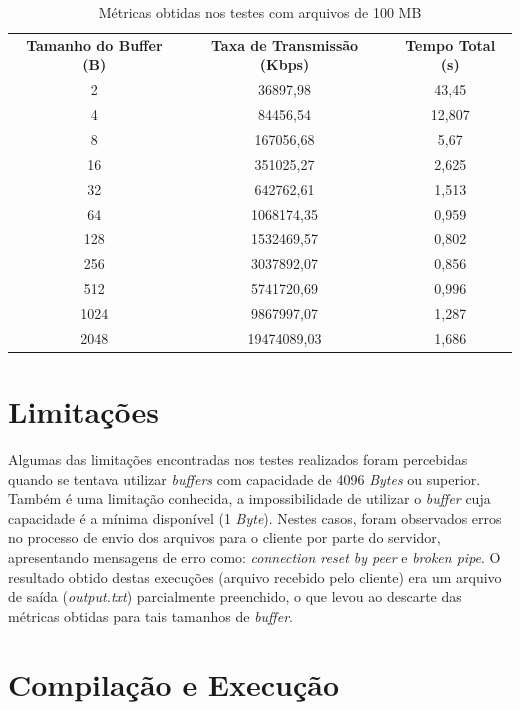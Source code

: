 \documentclass[a4paper, 12pt]{article}
\begin{document}
\begin{table}[H]
    \centering
    \caption{Métricas obtidas nos testes com arquivos de 100 MB}
    \vspace{0.2cm}
    \label{tab:exampleTab3}
    \begin{tabular}{c|c|c}
        \vspace{0.2cm}
        \textbf{Tamanho do Buffer (B)} & \textbf{Taxa de Transmissão (Kbps)} & \textbf{Tempo Total (s)}\\
        2 & 36897,98 & 43,45\\
        4 & 84456,54 & 12,807\\
        8 & 167056,68 & 5,67\\
        16 & 351025,27 & 2,625\\
        32 & 642762,61 & 1,513\\
        64 & 1068174,35 & 0,959\\
        128 & 1532469,57 & 0,802\\
        256 & 3037892,07 & 0,856\\
        512 & 5741720,69 & 0,996\\
        1024 & 9867997,07 & 1,287\\
        2048 & 19474089,03 & 1,686
    \end{tabular}
\end{table}

\section{Limitações}

Algumas das limitações encontradas nos testes realizados foram percebidas quando se tentava utilizar \emph{buffers} com capacidade de 4096 \emph{Bytes} ou superior. Também é uma limitação conhecida, a impossibilidade de utilizar o \emph{buffer} cuja capacidade é a mínima disponível (1 \emph{Byte}). Nestes casos, foram observados erros no processo de envio dos arquivos para o cliente por parte do servidor, apresentando mensagens de erro como: \emph{connection reset by peer} e \emph{broken pipe}. O resultado obtido destas execuções (arquivo recebido pelo cliente) era um arquivo de saída (\emph{output.txt}) parcialmente preenchido, o que levou ao descarte das métricas obtidas para tais tamanhos de \emph{buffer}.

\section{Compilação e Execução}
\end{document}

